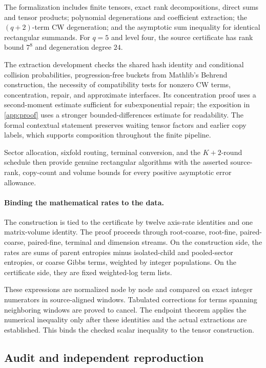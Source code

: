 \documentclass[11pt,a4paper]{article}
\begin{document}
The formalization includes finite tensors, exact rank decompositions, direct sums and tensor products; polynomial degenerations and coefficient extraction; the $(q+2)$-term CW degeneration; and the asymptotic sum inequality for identical rectangular summands. For $q=5$ and level four, the source certificate has rank bound $7^8$ and degeneration degree $24$.

The extraction development checks the shared hash identity and conditional collision probabilities, progression-free buckets from Mathlib's Behrend construction, the necessity of compatibility tests for nonzero CW terms, concentration, repair, and approximate interfaces. Its concentration proof uses a second-moment estimate sufficient for subexponential repair; the exposition in \cref{app:proof} uses a stronger bounded-differences estimate for readability. The formal contextual statement preserves waiting tensor factors and earlier copy labels, which supports composition throughout the finite pipeline.

Sector allocation, sixfold routing, terminal conversion, and the $K+2$-round schedule then provide genuine rectangular algorithms with the asserted source-rank, copy-count and volume bounds for every positive asymptotic error allowance.

\paragraph{Binding the mathematical rates to the data.}
The construction is tied to the certificate by twelve axis-rate identities and one matrix-volume identity. The proof proceeds through root-coarse, root-fine, paired-coarse, paired-fine, terminal and dimension streams. On the construction side, the rates are sums of parent entropies minus isolated-child and pooled-sector entropies, or coarse Gibbs terms, weighted by integer populations. On the certificate side, they are fixed weighted-log term lists.

These expressions are normalized node by node and compared on exact integer numerators in source-aligned windows. Tabulated corrections for terms spanning neighboring windows are proved to cancel. The endpoint theorem applies the numerical inequality only after these identities and the actual extractions are established. This binds the checked scalar inequality to the tensor construction.

\subsection{Audit and independent reproduction}
\end{document}
